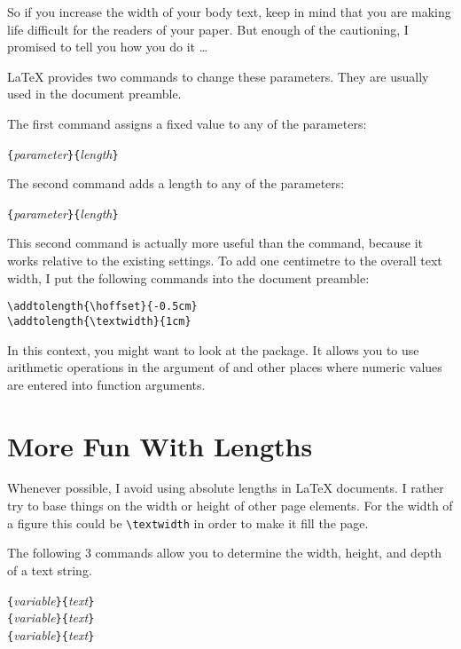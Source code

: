 So if you increase the width of your body text, keep in mind that you
are making life difficult for the readers of your paper. But enough
of the cautioning, I promised to tell you how you do it \ldots

\LaTeX{} provides two commands to change these parameters. They are
usually used in the document preamble.

The first command assigns a fixed value to any of the parameters:
\begin{lscommand}
  \verb|{|\emph{parameter}\verb|}{|\emph{length}\verb|}|
\end{lscommand}

The second command adds a length to any of the parameters:
\begin{lscommand}
  \verb|{|\emph{parameter}\verb|}{|\emph{length}\verb|}|
\end{lscommand}

This second command is actually more useful than the 
command, because it works relative to the existing settings.
To add one centimetre to the overall text width, I put the
following commands into the document preamble:
\begin{code}
\verb|\addtolength{\hoffset}{-0.5cm}|\\
\verb|\addtolength{\textwidth}{1cm}|
\end{code}

In this context, you might want to look at the  package.
It allows you to use arithmetic operations in the argument of 
and other places where numeric values are entered into function
arguments.

\section{More Fun With Lengths}

Whenever possible, I avoid using absolute lengths in
\LaTeX{} documents. I rather try to base things on the width or height
of other page elements. For the width of a figure this could
be \verb|\textwidth| in order to make it fill the page.

The following 3 commands allow you to determine the width, height, and
depth of a text string.

\begin{lscommand}
  \verb|{|\emph{variable}\verb|}{|\emph{text}\verb|}|\\
  \verb|{|\emph{variable}\verb|}{|\emph{text}\verb|}|\\
  \verb|{|\emph{variable}\verb|}{|\emph{text}\verb|}|
\end{lscommand}

